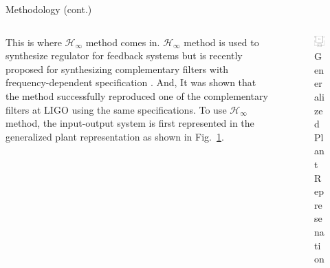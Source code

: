 \documentclass{beamer}
\begin{document}
\begin{frame}[t]
\begin{columns}[t]
\begin{column}{0.32\linewidth}
\begin{block}{Methodology (cont.)}
				\begin{columns}[t, onlytextwidth]
					\begin{column}{0.5\textwidth}
						This is where $\mathcal{H}_\infty$ method comes in.
						$\mathcal{H}_\infty$ method is used to synthesize regulator for feedback systems but is recently proposed for synthesizing complementary filters with frequency-dependent specification \cite{Thomas:2019}.
						And, It was shown that the method successfully reproduced one of the complementary filters at LIGO \cite{Matichard:2015} using the same specifications.
						To use $\mathcal{H}_\infty$ method, the input-output system is first represented in the generalized plant representation as shown in Fig.~\ref{fig:generalized_plant_representation}.
					\end{column}
					\begin{column}{0.5\textwidth}
						\begin{figure}
							\centering
							\includegraphics[width=0.55\linewidth]{generalized_plant}
							\caption{Generalized Plant Represenation}
							\label{fig:generalized_plant_representation}
						\end{figure}
					\end{column}
				\end{columns}
			
			\medskip
			

\end{block}
\end{column}
\end{columns}
\end{frame}
\end{document}

